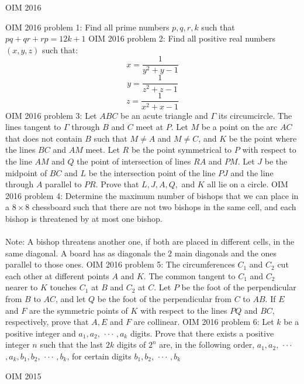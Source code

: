 OIM 2016 

OIM 2016 problem 1:  Find all prime numbers $p,q,r,k$ such that $pq+qr+rp = 12k+1$ 
OIM 2016 problem 2:  Find all positive real numbers $(x,y,z)$ such that:
\[ x = \frac{1}{y^2+y-1} \]
\[ y = \frac{1}{z^2+z-1} \]
\[ z = \frac{1}{x^2+x-1} \] 
OIM 2016 problem 3:  Let $ABC$ be an acute triangle and $\Gamma$ its circumcircle. The lines tangent to $\Gamma$ through $B$ and $C$ meet at $P$. Let $M$ be a point on the arc $AC$ that does not contain $B$ such that $M \neq A$ and $M \neq C$, and $K$ be the point where the lines $BC$ and $AM$ meet. Let $R$ be the point symmetrical to $P$ with respect to the line $AM$ and $Q$ the point of intersection of lines $RA$ and $PM$. Let $J$ be the midpoint of $BC$ and $L$ be the intersection point of the line $PJ$ and the line through $A$ parallel to $PR$. Prove that $L, J, A, Q,$ and $K$ all lie on a circle. 
OIM 2016 problem 4:  Determine the maximum number of bishops that we can place in a $8 \times 8$ chessboard such that there are not two bishops in the same cell, and each bishop is threatened by at most one bishop. \\\\
Note: A bishop threatens another one, if both are placed in different cells, in the same diagonal. A board has as diagonals the $2$ main diagonals and the ones parallel to those ones. 
OIM 2016 problem 5:  The circumferences $C_1$ and $C_2$ cut each other at different points $A$ and $K$. The common tangent to $C_1$ and $C_2$ nearer to $K$ touches $C_1$ at $B$ and $C_2$ at $C$. Let $P$ be the foot of the perpendicular from $B$ to $AC$, and let $Q$ be the foot of the perpendicular from $C$ to $AB$. If $E$ and $F$ are the symmetric points of $K$ with respect  to the lines $PQ$ and $BC$, respectively, prove that $A, E$ and $F$ are collinear. 
OIM 2016 problem 6:  Let $k$ be a positive integer and $a_1, a_2,$ $\cdot \cdot \cdot$ $, a_k$ digits. Prove that there exists a positive integer $n$ such that the last $2k$ digits of $2^n$ are, in the following order, $a_1, a_2,$ $\cdot \cdot \cdot$ $, a_k , b_1, b_2,$ $\cdot \cdot \cdot$ $, b_k$, for certain digits $b_1, b_2,$ $\cdot \cdot \cdot$ $, b_k$ 

OIM 2015 


